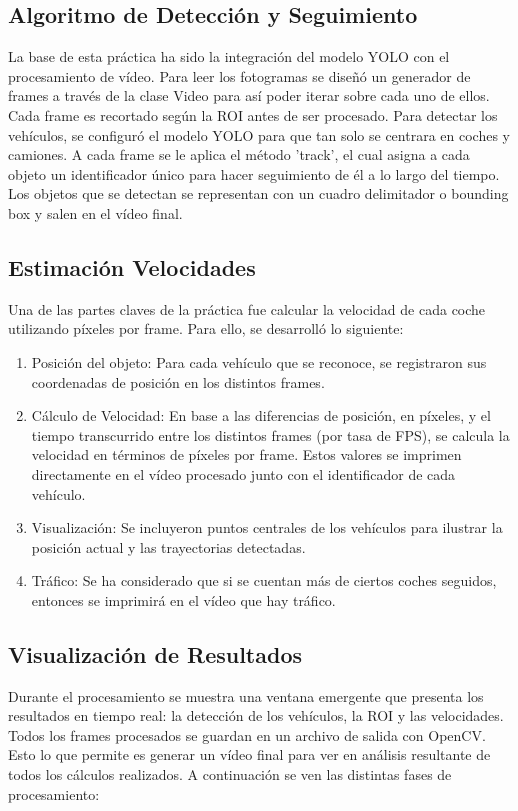 \subsection{Algoritmo de Detección y Seguimiento}
La base de esta práctica ha sido la integración del modelo YOLO con el procesamiento de vídeo. 
Para leer los fotogramas se diseñó un generador de frames a través de la clase Video para así poder iterar sobre cada uno de ellos.  Cada frame es recortado según la ROI antes de ser procesado.
Para detectar los vehículos, se configuró el modelo YOLO para que tan solo se centrara en coches y camiones.  A cada frame se le aplica el método 'track', el cual asigna a cada objeto un identificador único para hacer seguimiento de él a lo largo del tiempo.
Los objetos que se detectan se representan con un cuadro delimitador o bounding box y salen en el vídeo final.


\subsection{Estimación Velocidades}
Una de las partes claves de la práctica fue calcular la velocidad de cada coche utilizando píxeles por frame.  Para ello, se desarrolló lo siguiente:
\begin{enumerate}
    \item Posición del objeto:
    Para cada vehículo que se reconoce, se registraron sus coordenadas de posición en los distintos frames.
    \item Cálculo de Velocidad:
    En base a las diferencias de posición, en píxeles, y el tiempo transcurrido entre los distintos frames (por tasa de FPS), se calcula la velocidad en términos de píxeles por frame.
    Estos valores se imprimen directamente en el vídeo procesado junto con el identificador de cada vehículo.
    \item Visualización:
    Se incluyeron puntos centrales de los vehículos para ilustrar la posición actual y las trayectorias detectadas.
    \item Tráfico:
    Se ha considerado que si se cuentan más de ciertos coches seguidos, entonces se imprimirá en el vídeo que hay tráfico.
\end{enumerate}

\subsection{Visualización de Resultados}
Durante el procesamiento se muestra una ventana emergente que presenta los resultados en tiempo real: la detección de los vehículos, la ROI y las velocidades. Todos los frames procesados se guardan en un archivo de salida con OpenCV.  Esto lo que permite es generar un vídeo final para ver en análisis 
resultante de todos los cálculos realizados.
A continuación se ven las distintas fases de procesamiento:

